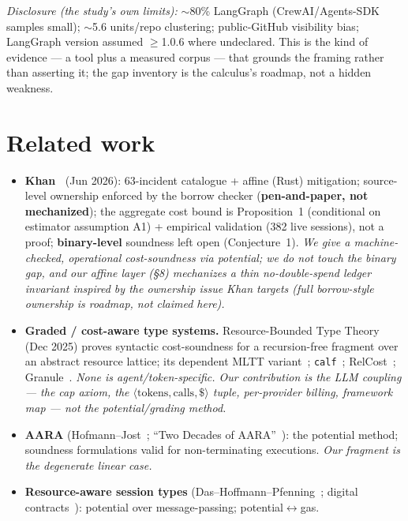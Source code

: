 \documentclass[11pt]{article}
\theoremstyle{plain}
\begin{document}
\emph{Disclosure (the study's own limits):} $\sim$80\% LangGraph (CrewAI/Agents-SDK samples small);
$\sim$5.6 units/repo clustering; public-GitHub visibility bias; LangGraph version assumed $\ge$1.0.6
where undeclared. This is the kind of evidence --- a tool plus a measured corpus --- that grounds
the framing rather than asserting it; the gap inventory is the calculus's roadmap, not a hidden
weakness.

\section{Related work}

\begin{itemize}
\item \textbf{Khan~\cite{khan2026}} (Jun 2026): 63-incident catalogue + affine (Rust) mitigation;
  source-level ownership enforced by the borrow checker (\textbf{pen-and-paper, not mechanized});
  the aggregate cost bound is Proposition~1 (conditional on estimator assumption A1) + empirical
  validation (382 live sessions), not a proof; \textbf{binary-level} soundness left open
  (Conjecture~1). \emph{We give a machine-checked, operational cost-soundness via potential; we do
  not touch the binary gap, and our affine layer (\S8) mechanizes a thin no-double-spend ledger
  invariant inspired by the ownership issue Khan targets (full borrow-style ownership is roadmap,
  not claimed here).}
\item \textbf{Graded / cost-aware type systems.} Resource-Bounded Type Theory~\cite{rbtt2025}
  (Dec 2025) proves syntactic cost-soundness for a recursion-free fragment over an abstract
  resource lattice; its dependent MLTT variant~\cite{rbttmltt2026}; \texttt{calf}~\cite{calf2021};
  RelCost~\cite{relcost2017}; Granule~\cite{granule2019}. \emph{None is agent/token-specific. Our
  contribution is the LLM coupling --- the cap axiom, the
  $\langle\text{tokens},\text{calls},\$\rangle$ tuple, per-provider billing, framework map --- not
  the potential/grading method.}
\item \textbf{AARA} (Hofmann--Jost~\cite{hofmannjost2003}; ``Two Decades of AARA''~\cite{aara2022}):
  the potential method; soundness formulations valid for non-terminating executions. \emph{Our
  fragment is the degenerate linear case.}
\item \textbf{Resource-aware session types} (Das--Hoffmann--Pfenning~\cite{dhp2018}; digital
  contracts~\cite{digitalcontracts2019}): potential over message-passing; potential$\leftrightarrow$gas.

\end{itemize}
\end{document}
